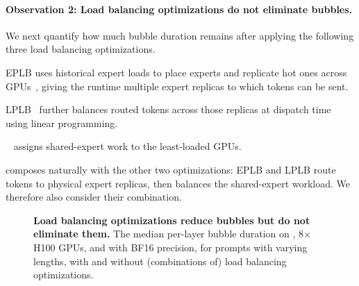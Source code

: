 \paragraph{Observation 2: Load balancing optimizations do not eliminate bubbles.}
\label{sec:char-optimizations}

We next quantify how much bubble duration remains after applying the following three load balancing optimizations.
\begin{enumerate*}[label=(\roman*)]
    \item \Ac{EPLB} uses historical expert loads to place experts and replicate hot ones across GPUs~\cite{deepseekv3,eplb}, giving the runtime multiple expert replicas to which tokens can be sent.
    \item \ac{LPLB}~\cite{lplb} further balances routed tokens across those replicas at dispatch time using linear programming. %
    \item \waterfill~\cite{waterfill} assigns shared-expert work to the least-loaded GPUs.
\end{enumerate*}
\waterfill composes naturally with the other two optimizations: \ac{EPLB} and \ac{LPLB} route tokens to physical expert replicas, then \waterfill balances the shared-expert workload.
We therefore also consider their combination.

\begin{figure}[t]
  \centering
  \caption{
    \textbf{Load balancing optimizations reduce bubbles but do not eliminate them.}
    The median per-layer bubble duration on \deepseekmoe, 8$\times$H100 GPUs, and with BF16 precision, for prompts with varying lengths, with and without (combinations of) load balancing optimizations.%
  }
  \label{fig:lb-sweep}
\end{figure}

